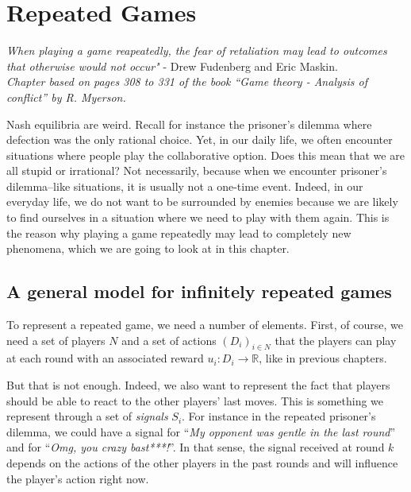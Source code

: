 \ifx \globalmark \undefined %
	
\else 	
\fi




\chapter{Repeated Games}
{\large{\itshape
When playing a game reapeatedly, the fear of retaliation may lead to outcomes that otherwise would not occur"} - Drew Fudenberg and Eric Maskin.\\
}
\label{chap:Rep}
{\small{\itshape
Chapter based on pages 308 to 331 of the book  ``Game theory - Analysis of conflict'' by R. Myerson.}\\
}


Nash equilibria are weird. Recall for instance the prisoner's dilemma where defection was the only rational choice. Yet, in our daily life, we often encounter situations where people play the collaborative option. Does this mean that we are all stupid or irrational? Not necessarily, because when we encounter prisoner's dilemma--like situations, it is usually not a one-time event. Indeed, in our everyday life, we do not want to be surrounded by enemies because we are likely to find ourselves in a situation where we need to play with them again. This is the reason why playing a game repeatedly may lead to completely new phenomena, which we are going to look at in this chapter.


%
%
%
%



\section{A general model for infinitely repeated games}



To represent a repeated game, we need a number of elements. First, of course, we need a set of players $N$ and a set of actions $(D_i)_{i \in N}$ that the players can play at each round with an associated reward $u_i: D_i \rightarrow \mathbb{R}$, like in previous chapters. 

But that is not enough. Indeed, we also want to represent the fact that players should be able to react to the other players' last moves. This is something we represent through a set of \emph{signals} $S_i$. For instance in the repeated prisoner's dilemma, we could have a signal for ``\emph{My opponent was gentle in the last round}'' and for ``\emph{Omg, you crazy bast***!}''. In that sense, the signal received at round $k$ depends on the actions of the other players in the past rounds and will influence the player's action right now. 

